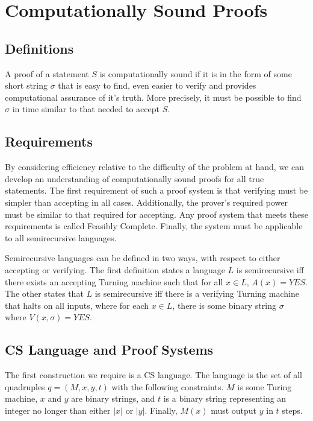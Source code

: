 \documentclass{article}
\begin{document}
\section{Computationally Sound Proofs \cite{Micali00}}

\subsection{Definitions}
A proof of a statement $S$
is computationally sound if it is in the form of some short string
$\sigma$
that is easy to find, even easier to verify and provides computational
assurance of it's truth. More precisely, it must be possible to find
$\sigma$ in time similar to that needed to accept $S$.

\subsection{Requirements}
By considering efficiency relative to the difficulty of the problem at
hand, we can develop an understanding of computationally sound proofs
for all true statements. The first requirement of such a proof system
is that verifying must be simpler than accepting in all
cases. Additionally, the prover's required power must be similar to
that required for accepting.  Any proof system that meets these
requirements is called Feasibly Complete.  Finally, the system must be
applicable to all semirecursive languages.

Semirecursive languages can be defined in two ways, with respect to
either accepting or verifying. The first definition states a language
$L$
is semirecursive iff there exists an accepting Turning machine such
that for all $x \in L$,
$A(x) = YES$.
The other states that $L$
is semirecursive iff there is a verifying Turning machine that halts
on all inputs, where for each $x \in L$,
there is some binary string $\sigma$ where $V(x, \sigma) = YES$.

\subsection{CS Language and Proof Systems}

The first construction we require is a CS language. The language is
the set of all quadruples $q = (M, x, y, t)$
with the following constraints. $M$
is some Turing machine, $x$
and $y$
are binary strings, and $t$
is a binary string representing an integer no longer than either $|x|$
or $|y|$. Finally, $M(x)$ must output $y$ in $t$ steps.
\end{document}
